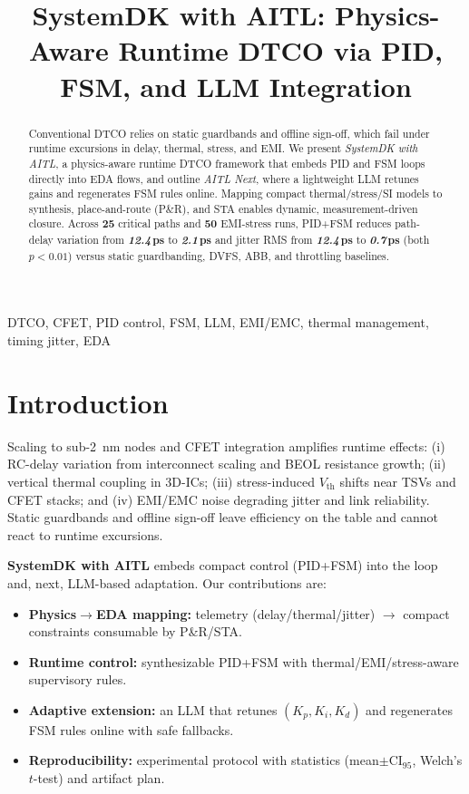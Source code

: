 \documentclass[conference]{IEEEtran}
\title{SystemDK with AITL: Physics-Aware Runtime DTCO via PID, FSM, and LLM Integration}
\author{%
  \IEEEauthorblockN{Shinichi Samizo}%
  \IEEEauthorblockA{Independent Semiconductor Researcher\\
  Email: \href{mailto:shin3t72@gmail.com}{shin3t72@gmail.com}}%
}
\newcommand{\placeholder}[1]{\textit{#1}} %
\newcommand{\CI}{\mathrm{CI}_{95}}
\begin{document}
\maketitle

\begin{abstract}
Conventional DTCO relies on static guardbands and offline sign-off, which fail under runtime excursions in delay, thermal, stress, and EMI. We present \emph{SystemDK with AITL}, a physics-aware runtime DTCO framework that embeds PID and FSM loops directly into EDA flows, and outline \emph{AITL Next}, where a lightweight LLM retunes gains and regenerates FSM rules online. Mapping compact thermal/stress/SI models to synthesis, place-and-route (P\&R), and STA enables dynamic, measurement-driven closure. Across \textbf{25} critical paths and \textbf{50} EMI-stress runs, PID+FSM reduces path-delay variation from \textbf{\placeholder{12.4}\,ps} to \textbf{\placeholder{2.1}\,ps} and jitter RMS from \textbf{\placeholder{12.4}\,ps} to \textbf{\placeholder{0.7}\,ps} (both $p<0.01$) versus static guardbanding, DVFS, ABB, and throttling baselines. %
\end{abstract}

\begin{IEEEkeywords}
DTCO, CFET, PID control, FSM, LLM, EMI/EMC, thermal management, timing jitter, EDA
\end{IEEEkeywords}

\section{Introduction}
Scaling to sub-\SI{2}{\nano\meter} nodes and CFET integration amplifies runtime effects: (i) RC-delay variation from interconnect scaling and BEOL resistance growth; (ii) vertical thermal coupling in 3D-ICs; (iii) stress-induced $V_{\mathrm{th}}$ shifts near TSVs and CFET stacks; and (iv) EMI/EMC noise degrading jitter and link reliability. Static guardbands and offline sign-off leave efficiency on the table and cannot react to runtime excursions.

\textbf{SystemDK with AITL} embeds compact control (PID+FSM) into the loop and, next, LLM-based adaptation. Our contributions are:
\begin{itemize}
  \item \textbf{Physics$\to$EDA mapping:} telemetry (delay/thermal/jitter) $\rightarrow$ compact constraints consumable by P\&R/STA.
  \item \textbf{Runtime control:} synthesizable PID+FSM with thermal/EMI/stress-aware supervisory rules.
  \item \textbf{Adaptive extension:} an LLM that retunes $(K_p,K_i,K_d)$ and regenerates FSM rules online with safe fallbacks.
  \item \textbf{Reproducibility:} experimental protocol with statistics (mean$\pm\CI$, Welch's $t$-test) and artifact plan.
\end{itemize}
\end{document}
